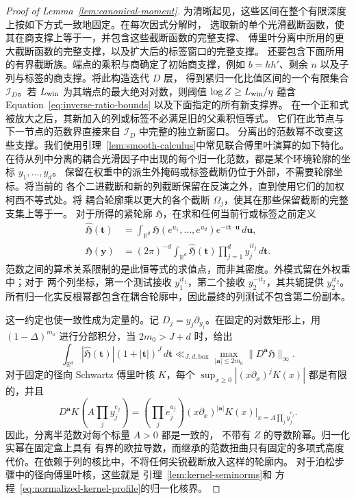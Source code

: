 \documentclass[11pt,a4paper]{article}
\numberwithin{equation}{section}
\numberwithin{figure}{section}
\theoremstyle{definition}
\theoremstyle{remark}
\begin{document}
\begin{proof}[Proof of Lemma~\ref{lem:canonical-moment}]
为清晰起见，这些区间在整个有限深度上按如下方式一致地固定。在每次因式分解时，
选取新的单个光滑截断函数，使其在商支撑上等于一，并包含这些截断函数的完整支撑、
傅里叶分离中所用的更大截断函数的完整支撑，以及扩大后的标签窗口的完整支撑。
还要包含下面所用的有界截断族。端点的乘积与商确定了初始商支撑，例如
\(b=hh'\)、剩余 \(n\) 以及子列与标签的商支撑。将此构造迭代 \(D\) 层，
得到紧归一化比值区间的一个有限集合 \(\mathcal I_D\)。若 \(L_{\rm win}\)
为其端点的最大绝对对数，则阈值
\(\log Z\ge L_{\rm win}/\eta\) 蕴含
Equation~\eqref{eq:inverse-ratio-bounds} 以及下面指定的所有新支撑界。
在一个正和式被放大之后，其新加入的列或标签不必满足旧的父乘积恒等式。
它们在此节点与下一节点的范数界直接来自 \(\mathcal I_D\) 中完整的独立新窗口。
分离出的范数幂不改变这些支撑。我们使用引理~\ref{lem:smooth-calculus}中常见联合傅里叶演算的如下特化。
在待从列中分离的耦合光滑因子中出现的每个归一化范数，都是某个环境轮廓的坐标 \(y_1,\ldots,y_d\)。
保留在权重中的派生外掩码或标签截断仍位于外部，不需要轮廓坐标。将当前的
各个二进截断和新的列截断保留在反演之外，直到使用它们的加权柯西不等式处。将
耦合轮廓乘以更大的各个截断 \(\Omega_j\)，使其在那些保留截断的完整支集上等于一。
对于所得的紧轮廓 \(\mathfrak H\)，在求和任何当前行或标签之前定义
\begin{equation}\label{eq:inverse-log-fourier}
 \begin{split}
 \widehat{\mathfrak H}(\boldsymbol t)
   &=\int_{\mathbb R^d}\mathfrak H(e^{u_1},\ldots,e^{u_d})
             e^{-i\boldsymbol t\cdot\boldsymbol u}\,d\boldsymbol u,\\
 \mathfrak H(\boldsymbol y)
   &=(2\pi)^{-d}\int_{\mathbb R^d}\widehat{\mathfrak H}(\boldsymbol t)
          \prod_{j=1}^dy_j^{it_j}\,d\boldsymbol t.
 \end{split}
\end{equation}
范数之间的算术关系限制的是此恒等式的求值点，而非其密度。外模式留在外权重中；对于
两个列坐标，第一个测试接收 \(y_1^{it_1}\)，第二个接收 \(y_2^{-it_2}\)，其共轭提供
\(y_2^{it_2}\)。所有归一化实反根幂都包含在耦合轮廓中，因此最终的列测试不包含第二份副本。

这一约定也使一致性成为定量的。记
\(D_j=y_j\partial_{y_j}\)。在固定的对数矩形上，用
\((1-\Delta)^{m_0}\) 进行分部积分，当 \(2m_0>J+d\) 时，给出
\begin{equation}\label{eq:inverse-fourier-moment}
 \int_{\mathbb R^d}|\widehat{\mathfrak H}(\boldsymbol t)|
        (1+|\boldsymbol t|)^J\,d\boldsymbol t
 \ll_{J,d,\mathrm{box}}\max_{|\boldsymbol a|\le2m_0}
             \|D^{\boldsymbol a}\mathfrak H\|_\infty.
\end{equation}
对于固定的径向 Schwartz 傅里叶核 \(K\)，每个
\(\sup_{x\ge0}|(x\partial_x)^jK(x)|\) 都是有限的，并且
\[
 D^{\boldsymbol a}K\!\left(A\prod_jy_j^{e_j}\right)
 =\left(\prod_je_j^{a_j}\right)
   (x\partial_x)^{|\boldsymbol a|}K(x)
       \big|_{x=A\prod_jy_j^{e_j}}.
\]
因此，分离半范数对每个标量 \(A>0\) 都是一致的，
不带有 \(Z\) 的导数阶幂。归一化实幂在固定盒上具有
有界的欧拉导数，而继承的范数扭曲只有固定的多项式高度代价。在依赖于列的核比中，不将任何尖锐截断放入这样的轮廓内。
对于泊松步骤中的径向傅里叶核，这些就是
引理~\ref{lem:kernel-seminorms}和
方程~\eqref{eq:normalized-kernel-profile}的归一化核界。


\end{proof}
\end{document}
